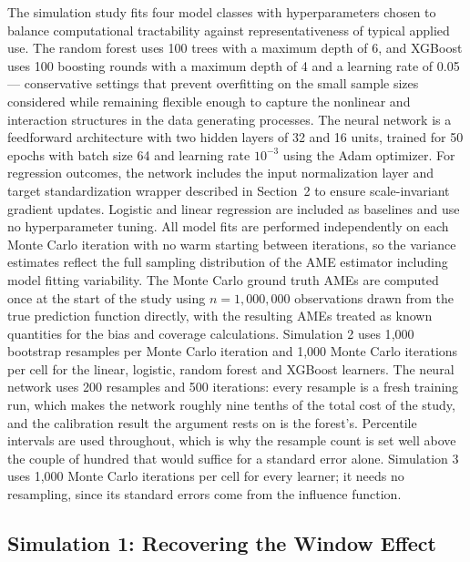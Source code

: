 \documentclass[12pt]{article}
\begin{document}
	The simulation study fits four model classes with hyperparameters chosen to balance computational tractability against representativeness of typical applied use. The random forest uses 100 trees with a maximum depth of 6, and XGBoost uses 100 boosting rounds with a maximum depth of 4 and a learning rate of 0.05 --- conservative settings that prevent overfitting on the small sample sizes considered while remaining flexible enough to capture the nonlinear and interaction structures in the data generating processes. The neural network is a feedforward architecture with two hidden layers of 32 and 16 units, trained for 50 epochs with batch size 64 and learning rate $10^{-3}$ using the Adam optimizer. For regression outcomes, the network includes the input normalization layer and target standardization wrapper described in Section~2 to ensure scale-invariant gradient updates. Logistic and linear regression are included as baselines and use no hyperparameter tuning. All model fits are performed independently on each Monte Carlo iteration with no warm starting between iterations, so the variance estimates reflect the full sampling distribution of the AME estimator including model fitting variability. The Monte Carlo ground truth AMEs are computed once at the start of the study using $n=1{,}000{,}000$ observations drawn from the true prediction function directly, with the resulting AMEs treated as known quantities for the bias and coverage calculations. Simulation 2 uses 1{,}000 bootstrap resamples per Monte Carlo iteration and 1{,}000 Monte Carlo iterations per cell for the linear, logistic, random forest and XGBoost learners. The neural network uses 200 resamples and 500 iterations: every resample is a fresh training run, which makes the network roughly nine tenths of the total cost of the study, and the calibration result the argument rests on is the forest's. Percentile intervals are used throughout, which is why the resample count is set well above the couple of hundred that would suffice for a standard error alone. Simulation 3 uses 1{,}000 Monte Carlo iterations per cell for every learner; it needs no resampling, since its standard errors come from the influence function.
	
	\subsection{Simulation 1: Recovering the Window Effect}
	
\end{document}
